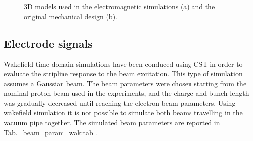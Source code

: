 \begin{figure}[ht]
\centering
{}
\hspace{3mm}
\caption{3D models used in the electromagnetic simulations (a) and the original mechanical design (b).}
\label{CSTvsSTEP_section}
\end{figure}


\subsection[Electrode signals]{Electrode signals}

Wakefield time domain simulations have been conduced using CST in order to evaluate the stripline response to the beam excitation. This type of simulation assumes a Gaussian beam. The beam parameters were chosen starting from the nominal proton beam used in the experiments, and the charge and bunch length was gradually decreased until reaching the electron beam parameters. Using wakefield simulation it is not possible to simulate both beams travelling in the vacuum pipe together. The simulated beam parameters are reported in Tab.~\ref{beam_param_wak:tab}.

